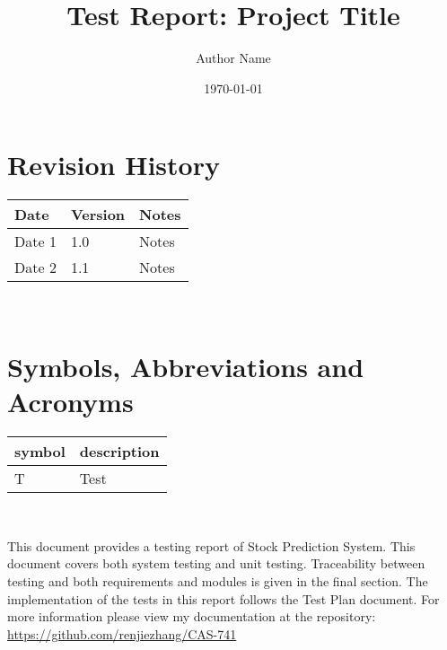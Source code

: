 \documentclass[12pt, titlepage]{article}
\begin{document}
\title{Test Report: Project Title} 
\author{Author Name}
\date{\today}
	
\maketitle


\section{Revision History}

\begin{tabularx}{\textwidth}{p{3cm}p{2cm}X}
\toprule {\bf Date} & {\bf Version} & {\bf Notes}\\
\midrule
Date 1 & 1.0 & Notes\\
Date 2 & 1.1 & Notes\\
\bottomrule
\end{tabularx}

~\newpage

\section{Symbols, Abbreviations and Acronyms}

\renewcommand{\arraystretch}{1.2}
\begin{tabular}{l l} 
  \toprule		
  \textbf{symbol} & \textbf{description}\\
  \midrule 
  T & Test\\
  \bottomrule
\end{tabular}\\


\newpage

\tableofcontents

\listoftables %

\listoffigures %

\newpage


This document provides a testing report of Stock Prediction System. This document covers both system testing and unit testing.
 Traceability between testing and both requirements and modules
is given in the final section. The implementation of the tests in this
report follows the Test Plan document. For more information please view my documentation at the repository:
 \url{https://github.com/renjiezhang/CAS-741}\\
\end{document}
